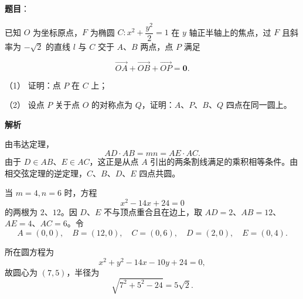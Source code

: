 \begin{answer}

\textbf{题目}：

已知 $O$ 为坐标原点，$F$ 为椭圆 $C:x^2+\dfrac{y^2}{2}=1$ 在 $y$ 轴正半轴上的焦点，过 $F$ 且斜率为 $-\sqrt2$ 的直线 $l$ 与 $C$ 交于 $A\text{、}B$ 两点，点 $P$ 满足

\nopagebreak[4]
\[
\overrightarrow{OA}+\overrightarrow{OB}+\overrightarrow{OP}=\boldsymbol0.
\]
\nopagebreak[4]
\begin{center}\end{center}
\nopagebreak[4]
（1） 证明：点 $P$ 在 $C$ 上；

（2） 设点 $P$ 关于点 $O$ 的对称点为 $Q$，证明：$A\text{、}P\text{、}B\text{、}Q$ 四点在同一圆上。

\textbf{解析}


由韦达定理，
\nopagebreak[4]
\[
AD\cdot AB=mn=AE\cdot AC.
\]
由于 $D\in AB$、$E\in AC$，这正是从点 $A$ 引出的两条割线满足的乘积相等条件。由相交弦定理的逆定理，$C\text{、}B\text{、}D\text{、}E$ 四点共圆。


当 $m=4,n=6$ 时，方程
\nopagebreak[4]
\[
x^2-14x+24=0
\]
的两根为 $2$、$12$。因 $D$、$E$ 不与顶点重合且在边上，取
$AD=2$、$AB=12$、$AE=4$、$AC=6$。令
\nopagebreak[4]
\[
A=(0,0),\quad B=(12,0),\quad C=(0,6),\quad
D=(2,0),\quad E=(0,4).
\]

所在圆方程为
\nopagebreak[4]
\[
x^2+y^2-14x-10y+24=0,
\]
故圆心为 $(7,5)$，半径为
\nopagebreak[4]
\[
\sqrt{7^2+5^2-24}=5\sqrt2.
\]



\end{answer}